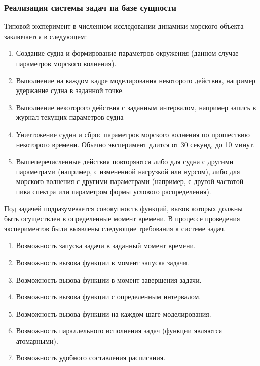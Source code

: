 \subsubsection{Реализация системы задач на базе сущности }
Типовой эксперимент в численном исследовании динамики морского объекта заключается в следующем:
\begin{enumerate}
	\item	Создание судна и формирование параметров окружения 
			(данном случае параметров морского волнения).
	\item	Выполнение на каждом кадре моделирования некоторого действия, например удержание судна 
			в заданной точке.
	\item	Выполнение некоторого действия с заданным интервалом, например запись в журнал текущих							параметров судна
	\item	Уничтожение судна и сброс параметров морского волнения по прошествию некоторого времени. 
			Обычно эксперимент длится от 30 секунд, до 10 минут.
	\item	Вышеперечисленные действия повторяются либо для судна с другими параметрами 
			(например, с измененной нагрузкой или курсом), либо для морского волнения с другими параметрами (например, с другой частотой пика спектра или параметром формы углового распределения).
\end{enumerate}

Под задачей подразумевается совокупность функций, вызов которых должны быть осуществлен в определенные момент времени. В процессе проведения экспериментов были выявлены следующие требования к системе задач.
\begin{enumerate}
	\item Возможность запуска задачи в заданный момент времени.
	\item 	Возможность вызова функции в момент запуска задачи. 
	\item Возможность вызова функции в момент завершения задачи.
	\item Возможность вызова функции с определенным интервалом.
	\item Возможность вызова функции на каждом шаге моделирования.
	\item Возможность параллельного исполнения задач (функции являются атомарными).
	\item Возможность удобного составления расписания.
\end{enumerate}

